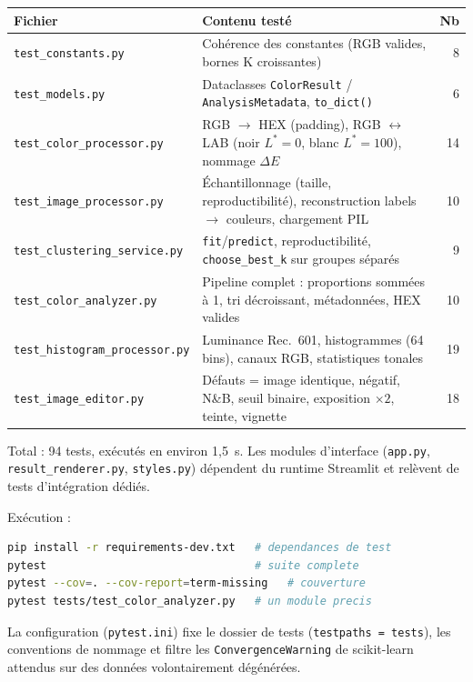 \documentclass[11pt,a4paper]{article}
\begin{document}
\begin{table}[h]
\centering
\small
\begin{tabular}{@{}p{5.2cm}p{8.2cm}r@{}}
\toprule
\textbf{Fichier} & \textbf{Contenu testé} & \textbf{Nb} \\
\midrule
\texttt{test\_constants.py} &
Cohérence des constantes (RGB valides, bornes K croissantes) & 8 \\
\texttt{test\_models.py} &
Dataclasses \texttt{ColorResult} / \texttt{AnalysisMetadata},
\texttt{to\_dict()} & 6 \\
\texttt{test\_color\_processor.py} &
RGB $\rightarrow$ HEX (padding), RGB $\leftrightarrow$ LAB (noir
$L^*=0$, blanc $L^*=100$), nommage $\Delta E$ & 14 \\
\texttt{test\_image\_processor.py} &
Échantillonnage (taille, reproductibilité), reconstruction labels
$\rightarrow$ couleurs, chargement PIL & 10 \\
\texttt{test\_clustering\_service.py} &
\texttt{fit}/\texttt{predict}, reproductibilité,
\texttt{choose\_best\_k} sur groupes séparés & 9 \\
\texttt{test\_color\_analyzer.py} &
Pipeline complet : proportions sommées à 1, tri décroissant,
métadonnées, HEX valides & 10 \\
\texttt{test\_histogram\_processor.py} &
Luminance Rec.~601, histogrammes (64 bins), canaux RGB, statistiques
tonales & 19 \\
\texttt{test\_image\_editor.py} &
Défauts = image identique, négatif, N\&B, seuil binaire, exposition
$\times 2$, teinte, vignette & 18 \\
\bottomrule
\end{tabular}
\end{table}

\noindent Total : 94 tests, exécutés en environ 1,5~s. Les modules
d'interface (\texttt{app.py}, \texttt{result\_renderer.py},
\texttt{styles.py}) dépendent du runtime Streamlit et relèvent de tests
d'intégration dédiés.

Exécution :

\begin{lstlisting}[language=bash]
pip install -r requirements-dev.txt   # dependances de test
pytest                                # suite complete
pytest --cov=. --cov-report=term-missing   # couverture
pytest tests/test_color_analyzer.py   # un module precis
\end{lstlisting}

La configuration (\texttt{pytest.ini}) fixe le dossier de tests
(\texttt{testpaths = tests}), les conventions de nommage et filtre les
\texttt{ConvergenceWarning} de scikit-learn attendus sur des données
volontairement dégénérées.
\end{document}
